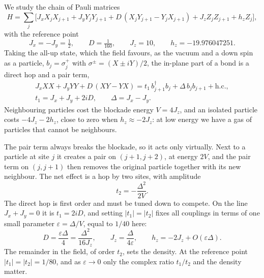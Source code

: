 \documentclass[11pt]{article}
\begin{document}
We study the chain of Pauli matrices
\begin{equation}
H=\sum_j\Big[J_xX_jX_{j+1}+J_yY_jY_{j+1}+D\,(X_jY_{j+1}-Y_jX_{j+1})+J_zZ_jZ_{j+1}+h_zZ_j\Big],
\label{eq:H}
\end{equation}
with the reference point
\begin{equation}
J_x=-J_y=\tfrac12,\qquad D=\tfrac1{160},\qquad J_z=10,\qquad h_z=-19.976047251 .
\label{eq:ref}
\end{equation}
Taking the all-up state, which the field favours, as the vacuum and a down spin as a particle, $b_j=\sigma^+_j$ with $\sigma^\pm=(X\pm iY)/2$, the in-plane part of a bond is a direct hop and a pair term,
\begin{equation}
\begin{gathered}
J_xXX+J_yYY+D\,(XY-YX)=t_1\,b^\dagger_{j+1}b_j+\Delta\,b_jb_{j+1}+\mathrm{h.c.},\\
t_1=J_x+J_y+2iD,\qquad \Delta=J_x-J_y .
\end{gathered}
\label{eq:particles}
\end{equation}
Neighbouring particles cost the blockade energy $V=4J_z$, and an isolated particle costs $-4J_z-2h_z$, close to zero when $h_z\approx-2J_z$: at low energy we have a gas of particles that cannot be neighbours.

The pair term always breaks the blockade, so it acts only virtually. Next to a particle at site $j$ it creates a pair on $(j+1,j+2)$, at energy $2V$, and the pair term on $(j,j+1)$ then removes the original particle together with its new neighbour. The net effect is a hop by two sites, with amplitude
\begin{equation}
t_2=-\frac{\Delta^2}{2V}.
\label{eq:t2}
\end{equation}
The direct hop is first order and must be tuned down to compete. On the line $J_x+J_y=0$ it is $t_1=2iD$, and setting $|t_1|=|t_2|$ fixes all couplings in terms of one small parameter $\varepsilon=\Delta/V$, equal to $1/40$ here:
\begin{equation}
D=\frac{\varepsilon\Delta}{4}=\frac{\Delta^2}{16J_z},\qquad J_z=\frac{\Delta}{4\varepsilon},\qquad h_z=-2J_z+O(\varepsilon\Delta).
\label{eq:eps}
\end{equation}
The remainder in the field, of order $t_2$, sets the density. At the reference point $|t_1|=|t_2|=1/80$, and as $\varepsilon\to0$ only the complex ratio $t_1/t_2$ and the density matter.

\end{document}
